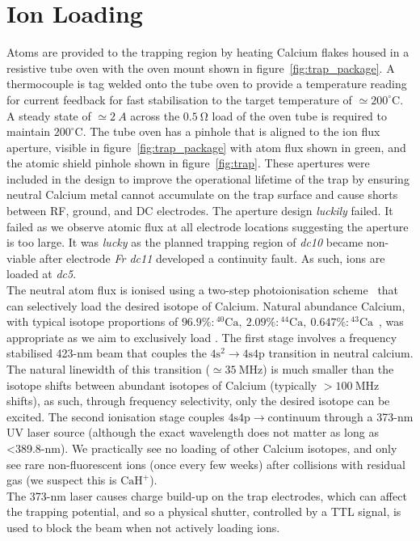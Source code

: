 \section{Ion Loading}
    Atoms are provided to the trapping region by heating Calcium flakes housed
    in a resistive tube oven with the oven mount shown in figure~\ref{fig:trap_package}. A
    thermocouple is tag welded onto the tube oven to provide a temperature reading
    for current feedback for fast stabilisation to the target temperature of $\simeq
    200^\circ\mathrm{C}$. A steady state of $\simeq 2~\unit{A}$
    across the $0.5~\unit{\ohm}$ load of the oven tube is required to maintain $200^\circ\mathrm{C}$. The tube oven has a
    pinhole that is aligned to the ion flux aperture, visible in
    figure~\ref{fig:trap_package} with atom flux shown in green, and the atomic shield pinhole shown in
    figure~\ref{fig:trap}. These apertures were included in the design to
    improve the operational lifetime of the trap by ensuring neutral Calcium metal cannot
    accumulate on the trap surface and cause shorts between RF, ground, and DC
    electrodes. The aperture design \emph{luckily} failed. It failed as we
    observe atomic flux at all electrode locations suggesting the aperture is
    too large. It was \emph{lucky} as the planned trapping region of \emph{dc10} became
    non-viable after electrode \emph{Fr dc11} developed a continuity fault. As such, ions are loaded at \emph{dc5}.\\
    The neutral atom flux is ionised using a two-step photoionisation
    scheme~\cite{lucas_isotope-selective_2004} that can selectively load the desired isotope of Calcium.
    Natural abundance Calcium, with typical isotope proportions of
    $96.9\%:\mathrm{^{40}Ca},~2.09\%:\mathrm{^{44}Ca},~0.647\%:\mathrm{^{43}Ca}$~\cite{lucas_isotope-selective_2004}, was appropriate as we aim to exclusively load \ca.
    The first stage involves a frequency stabilised 423-nm beam
    that couples the $4\mathrm{s}^2\rightarrow 4\mathrm{s}4\mathrm{p}$ transition in neutral calcium. The natural linewidth of this transition ($\simeq 35~\unit{\mega\hertz}$) is much smaller than the isotope shifts between abundant isotopes of Calcium (typically $>100~\unit{\mega\hertz}$ shifts), as such, through frequency selectivity, only the desired isotope can be excited. 
    The second ionisation stage couples $4\mathrm{s}4\mathrm{p}\rightarrow \mathrm{continuum}$ through
    a 373-nm UV laser source (although the exact wavelength does not matter as
    long as <389.8-nm).
    We practically see no loading of other
    Calcium isotopes, and only see rare non-fluorescent ions (once every few
    weeks) after collisions with residual gas (we suspect this is
    $\mathrm{CaH}^+$). \\
    The 373-nm laser causes charge build-up on the trap electrodes, which can
    affect the trapping potential, and so 
    a physical shutter, controlled by a TTL signal, is used to block
    the beam when not actively loading ions.\\
